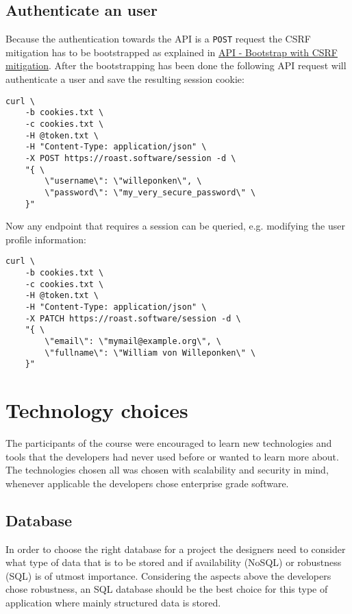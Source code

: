 \documentclass[12pt,a4paper]{report}
\begin{document}
\section{Authenticate an user}
Because the authentication towards the API is a \texttt{POST} request the CSRF mitigation has to be bootstrapped as explained in \hyperref[sec:api-bootstrap]{API - Bootstrap with CSRF mitigation}. After the bootstrapping has been done the following API request will authenticate a user and save the resulting session cookie:
\begin{verbatim}
curl \
    -b cookies.txt \
    -c cookies.txt \
    -H @token.txt \
    -H "Content-Type: application/json" \
    -X POST https://roast.software/session -d \
    "{ \
        \"username\": \"willeponken\", \
        \"password\": \"my_very_secure_password\" \
    }"
\end{verbatim}

Now any endpoint that requires a session can be queried, e.g. modifying the user profile information:
\begin{verbatim}
curl \
    -b cookies.txt \
    -c cookies.txt \
    -H @token.txt \
    -H "Content-Type: application/json" \
    -X PATCH https://roast.software/session -d \
    "{ \
        \"email\": \"mymail@example.org\", \
        \"fullname\": \"William von Willeponken\" \
    }"
\end{verbatim}

\chapter{Technology choices}
The participants of the course were encouraged to learn new technologies and tools that the developers had never used before or wanted to learn more about. The technologies chosen all was chosen with scalability and security in mind, whenever applicable the developers chose enterprise grade software.
\section{Database}
In order to choose the right database for a project the designers need to consider what type of data that is to be stored and if availability (NoSQL) or robustness (SQL) is of utmost importance.
Considering the aspects above the developers chose robustness, an SQL database should be the best choice for this type of application where mainly structured data is stored. 
\end{document}
